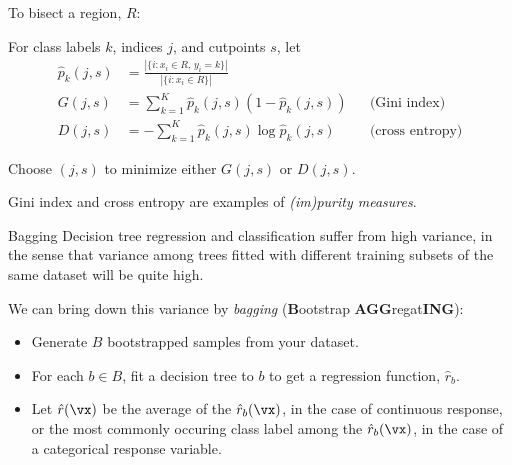 \documentclass{beamer}
\begin{document}
\begin{frame}{}
    To bisect a region, $R$:

    For class labels $k$, indices $j$, and cutpoints $s$, let
    \begin{align*}
        \hat p_k(j, s) &= \frac{|\{i : x_i\in R,\, y_i=k\}|}{|\{i : x_i\in R\}|}\\
        G(j, s) &= \sum_{k=1}^K \hat p_k(j, s)(1 - \hat p_k(j, s)) &&\text{(Gini index)}\\
        D(j, s) &= -\sum_{k=1}^K \hat p_k(j, s)\log \hat p_k(j, s) &&\text{(cross entropy)}
    \end{align*}

    Choose $(j, s)$ to minimize either $G(j, s)$ or $D(j, s)$.

    Gini index and cross entropy are examples of \emph{(im)purity measures}.
\end{frame}

\begin{frame}{Bagging}
    Decision tree regression and classification suffer from high variance,
    in the sense that variance among trees fitted with different training
    subsets of the same dataset will be quite high.
    
    We can bring down this variance by \emph{bagging}
    (\textbf{B}ootstrap \textbf{AGG}regat\textbf{ING}):

    \begin{itemize}
        \item Generate $B$ bootstrapped samples from your dataset.
        \item For each $b\in B$, fit a decision tree to $b$ to get
        a regression function, $\hat r_b$.
        \item Let $\hat r(\vx)$ be the average of the $\hat r_b(\vx)$, in the case of continuous response, or the most commonly occuring class label among the $\hat r_b(\vx)$, in the case of a categorical response variable.
    \end{itemize}
    

\end{frame}
\end{document}
